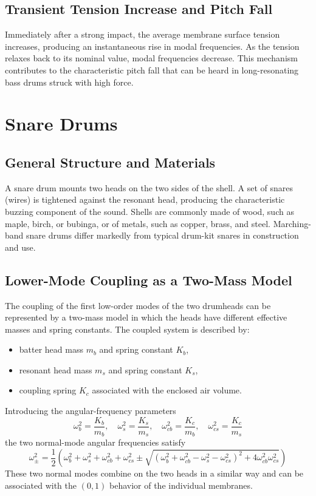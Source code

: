 \subsection{Transient Tension Increase and Pitch Fall}

Immediately after a strong impact, the average membrane surface tension increases, producing an instantaneous rise in modal frequencies. As the tension relaxes back to its nominal value, modal frequencies decrease. This mechanism contributes to the characteristic pitch fall that can be heard in long-resonating bass drums struck with high force. 

\section{Snare Drums}

\subsection{General Structure and Materials}

A snare drum mounts two heads on the two sides of the shell. A set of snares (wires) is tightened against the resonant head, producing the characteristic buzzing component of the sound. Shells are commonly made of wood, such as maple, birch, or bubinga, or of metals, such as copper, brass, and steel. Marching-band snare drums differ markedly from typical drum-kit snares in construction and use.

\subsection{Lower-Mode Coupling as a Two-Mass Model}

The coupling of the first low-order modes of the two drumheads can be represented by a two-mass model in which the heads have different effective masses and spring constants. The coupled system is described by:

\begin{itemize}
    \item batter head mass \( m_b \) and spring constant \( K_b \),
    \item resonant head mass \( m_s \) and spring constant \( K_s \),
    \item coupling spring \( K_c \) associated with the enclosed air volume.
\end{itemize}

Introducing the angular-frequency parameters
\[
\omega_b^2 = \frac{K_b}{m_b} , \quad \omega_s^2 = \frac{K_s}{m_s} , \quad \omega_{cb}^2 = \frac{K_c}{m_b} , \quad \omega_{cs}^2 = \frac{K_c}{m_s}
\]
the two normal-mode angular frequencies satisfy
\[
\omega_{\pm}^2 = \frac{1}{2}\left( \omega_b^2 + \omega_s^2 + \omega_{cb}^2 + \omega_{cs}^2 \pm \sqrt{\left( \omega_b^2 + \omega_{cb}^2 - \omega_s^2 - \omega_{cs}^2 \right)^2 + 4 \omega_{cb}^2 \omega_{cs}^2} \right)
\]
These two normal modes combine on the two heads in a similar way and can be associated with the \((0, 1)\) behavior of the individual membranes. 

